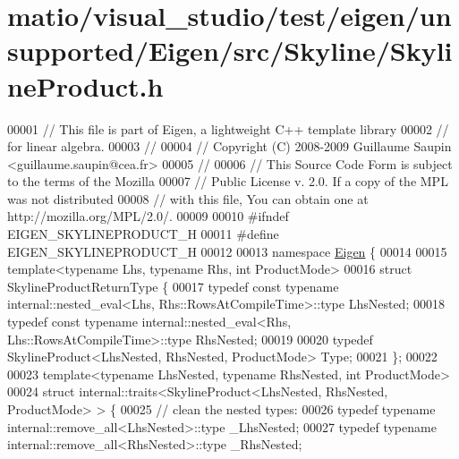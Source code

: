 \hypertarget{matio_2visual__studio_2test_2eigen_2unsupported_2_eigen_2src_2_skyline_2_skyline_product_8h_source}{}\section{matio/visual\+\_\+studio/test/eigen/unsupported/\+Eigen/src/\+Skyline/\+Skyline\+Product.h}
\label{matio_2visual__studio_2test_2eigen_2unsupported_2_eigen_2src_2_skyline_2_skyline_product_8h_source}

\begin{DoxyCode}
00001 \textcolor{comment}{// This file is part of Eigen, a lightweight C++ template library}
00002 \textcolor{comment}{// for linear algebra.}
00003 \textcolor{comment}{//}
00004 \textcolor{comment}{// Copyright (C) 2008-2009 Guillaume Saupin <guillaume.saupin@cea.fr>}
00005 \textcolor{comment}{//}
00006 \textcolor{comment}{// This Source Code Form is subject to the terms of the Mozilla}
00007 \textcolor{comment}{// Public License v. 2.0. If a copy of the MPL was not distributed}
00008 \textcolor{comment}{// with this file, You can obtain one at http://mozilla.org/MPL/2.0/.}
00009 
00010 \textcolor{preprocessor}{#ifndef EIGEN\_SKYLINEPRODUCT\_H}
00011 \textcolor{preprocessor}{#define EIGEN\_SKYLINEPRODUCT\_H}
00012 
00013 \textcolor{keyword}{namespace }\hyperlink{namespace_eigen}{Eigen} \{ 
00014 
00015 \textcolor{keyword}{template}<\textcolor{keyword}{typename} Lhs, \textcolor{keyword}{typename} Rhs, \textcolor{keywordtype}{int} ProductMode>
00016 \textcolor{keyword}{struct }SkylineProductReturnType \{
00017     \textcolor{keyword}{typedef} \textcolor{keyword}{const} \textcolor{keyword}{typename} internal::nested\_eval<Lhs, Rhs::RowsAtCompileTime>::type LhsNested;
00018     \textcolor{keyword}{typedef} \textcolor{keyword}{const} \textcolor{keyword}{typename} internal::nested\_eval<Rhs, Lhs::RowsAtCompileTime>::type RhsNested;
00019 
00020     \textcolor{keyword}{typedef} SkylineProduct<LhsNested, RhsNested, ProductMode> Type;
00021 \};
00022 
00023 \textcolor{keyword}{template}<\textcolor{keyword}{typename} LhsNested, \textcolor{keyword}{typename} RhsNested, \textcolor{keywordtype}{int} ProductMode>
00024 \textcolor{keyword}{struct }internal::traits<SkylineProduct<LhsNested, RhsNested, ProductMode> > \{
00025     \textcolor{comment}{// clean the nested types:}
00026     \textcolor{keyword}{typedef} \textcolor{keyword}{typename} internal::remove\_all<LhsNested>::type \_LhsNested;
00027     \textcolor{keyword}{typedef} \textcolor{keyword}{typename} internal::remove\_all<RhsNested>::type \_RhsNested;

\end{DoxyCode}
